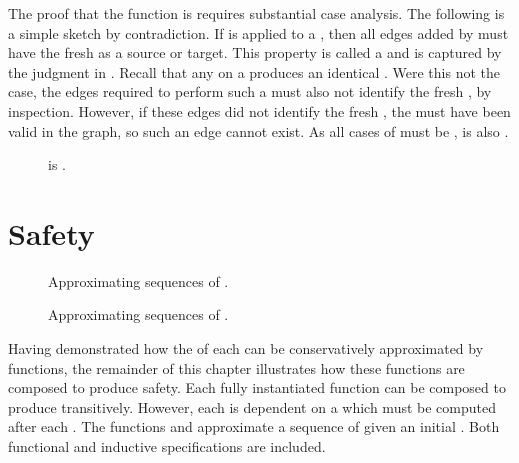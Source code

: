 The proof that the \COQendow{} function is \TMattenuating{} requires substantial case analysis.
The following is a simple sketch by contradiction.
If \COQendow{} is applied to a \TMmaximal{} \TMaccessGraph{}, then all edges added by \TMtransfer{} must have the fresh \TMobj{} as a source or target.
This property is called a \TMAGprojection{} and is captured by the \COQAGproject{} judgment in .
Recall that any \TMtransfer{} on a \TMmaximal{} \TMaccessGraph{} produces an identical \TMaccessGraph{}.
Were this not the case, the edges required to perform such a \TMtransfer{} must also not identify the fresh \TMobj{}, by inspection.
However, if these edges did not identify the fresh \TMobj{}, the \TMtransfer{} must have been valid in the \TMmaximal{} graph, so such an edge cannot exist.
As all cases of \COQpotAccOp{} must be \TMattenuating{}, \COQpotAccOp{} is also \TMattenuating{}.

\begin{figure}
  \COQDOCagReducePotAccOp{}
  \caption{\COQpotAccOp{} is \TMattenuating{}.}
\end{figure}

\section{Safety}

\begin{figure}
  \COQDOCdirAccExecute{}
  \COQDOCdirAccExecuteSpec{}
  \COQDOCdirAccExecuteSpecEqIff{}
  \COQDOCdirAccExecuteSpecDirAccExecute{}
  \caption{Approximating sequences of \TMdirAcc{} \TMops{}.}
\end{figure}

\begin{figure}
  \COQDOCpotAccExecute{}
  \COQDOCpotAccExecuteSpec{}
  \COQDOCpotAccExecuteSpecEqIff{}
  \COQDOCpotAccExecuteSpecPotAccExecute{}
  \caption{Approximating sequences of \TMpotAcc{} \TMops{}.}
\end{figure}

Having demonstrated how the \TMpotAcc{} of each \TMop{} can be conservatively approximated by \TMattenuating{} functions, the remainder of this chapter illustrates how these functions are composed to produce safety.
Each fully instantiated \TMattenuating{} function can be composed to produce \TMattenuation{} transitively.
However, each is dependent on a \TMsystemState{} which must be computed after each \TMop{}.
The functions \COQdirAccExecute{} and \COQpotAccExecute{} approximate a sequence of \TMops{} given an initial \TMsystemState{}.
Both functional and inductive specifications are included.

